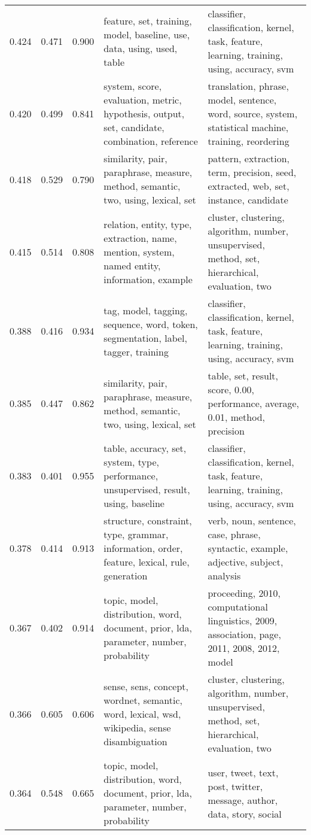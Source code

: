 \begin{tabular}{cccp{5cm}p{5cm}}
0.424 & 0.471 & 0.900 & feature, set, training, model, baseline, use, data, using, used, table & classifier, classification, kernel, task, feature, learning, training, using, accuracy, svm \\
0.420 & 0.499 & 0.841 & system, score, evaluation, metric, hypothesis, output, set, candidate, combination, reference & translation, phrase, model, sentence, word, source, system, statistical machine, training, reordering \\
0.418 & 0.529 & 0.790 & similarity, pair, paraphrase, measure, method, semantic, two, using, lexical, set & pattern, extraction, term, precision, seed, extracted, web, set, instance, candidate \\
0.415 & 0.514 & 0.808 & relation, entity, type, extraction, name, mention, system, named entity, information, example & cluster, clustering, algorithm, number, unsupervised, method, set, hierarchical, evaluation, two \\
0.388 & 0.416 & 0.934 & tag, model, tagging, sequence, word, token, segmentation, label, tagger, training & classifier, classification, kernel, task, feature, learning, training, using, accuracy, svm \\
0.385 & 0.447 & 0.862 & similarity, pair, paraphrase, measure, method, semantic, two, using, lexical, set & table, set, result, score, 0.00, performance, average, 0.01, method, precision \\
0.383 & 0.401 & 0.955 & table, accuracy, set, system, type, performance, unsupervised, result, using, baseline & classifier, classification, kernel, task, feature, learning, training, using, accuracy, svm \\
0.378 & 0.414 & 0.913 & structure, constraint, type, grammar, information, order, feature, lexical, rule, generation & verb, noun, sentence, case, phrase, syntactic, example, adjective, subject, analysis \\
0.367 & 0.402 & 0.914 & topic, model, distribution, word, document, prior, lda, parameter, number, probability & proceeding, 2010, computational linguistics, 2009, association, page, 2011, 2008, 2012, model \\
0.366 & 0.605 & 0.606 & sense, sens, concept, wordnet, semantic, word, lexical, wsd, wikipedia, sense disambiguation & cluster, clustering, algorithm, number, unsupervised, method, set, hierarchical, evaluation, two \\
0.364 & 0.548 & 0.665 & topic, model, distribution, word, document, prior, lda, parameter, number, probability & user, tweet, text, post, twitter, message, author, data, story, social \\

\end{tabular}
